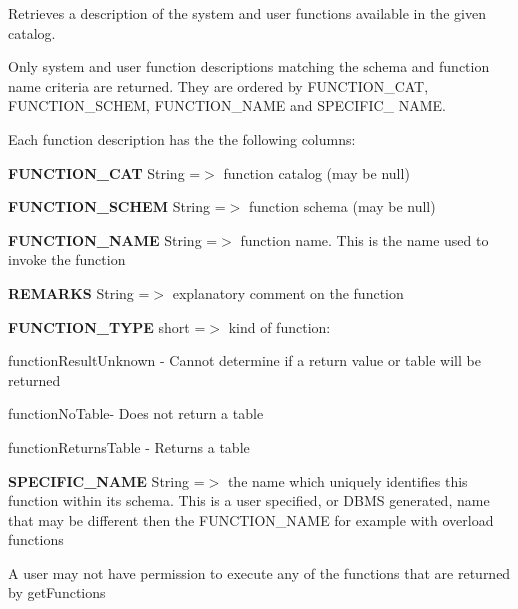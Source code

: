 Retrieves a description of the system and user functions available in the given catalog. 

Only system and user function descriptions matching the schema and function name criteria are returned. They are ordered by {\ttfamily F\+U\+N\+C\+T\+I\+O\+N\+\_\+\+C\+AT}, {\ttfamily F\+U\+N\+C\+T\+I\+O\+N\+\_\+\+S\+C\+H\+EM}, {\ttfamily F\+U\+N\+C\+T\+I\+O\+N\+\_\+\+N\+A\+ME} and {\ttfamily S\+P\+E\+C\+I\+F\+I\+C\+\_\+ N\+A\+ME}.

Each function description has the the following columns\+: 
\begin{DoxyEnumerate}
\item {\bfseries F\+U\+N\+C\+T\+I\+O\+N\+\_\+\+C\+AT} String =$>$ function catalog (may be {\ttfamily null}) 
\item {\bfseries F\+U\+N\+C\+T\+I\+O\+N\+\_\+\+S\+C\+H\+EM} String =$>$ function schema (may be {\ttfamily null}) 
\item {\bfseries F\+U\+N\+C\+T\+I\+O\+N\+\_\+\+N\+A\+ME} String =$>$ function name. This is the name used to invoke the function 
\item {\bfseries R\+E\+M\+A\+R\+KS} String =$>$ explanatory comment on the function 
\item {\bfseries F\+U\+N\+C\+T\+I\+O\+N\+\_\+\+T\+Y\+PE} short =$>$ kind of function\+: 
\begin{DoxyItemize}
\item function\+Result\+Unknown -\/ Cannot determine if a return value or table will be returned 
\item function\+No\+Table-\/ Does not return a table 
\item function\+Returns\+Table -\/ Returns a table 
\end{DoxyItemize}
\item {\bfseries S\+P\+E\+C\+I\+F\+I\+C\+\_\+\+N\+A\+ME} String =$>$ the name which uniquely identifies this function within its schema. This is a user specified, or D\+B\+MS generated, name that may be different then the {\ttfamily F\+U\+N\+C\+T\+I\+O\+N\+\_\+\+N\+A\+ME} for example with overload functions 
\end{DoxyEnumerate}

A user may not have permission to execute any of the functions that are returned by {\ttfamily get\+Functions}


